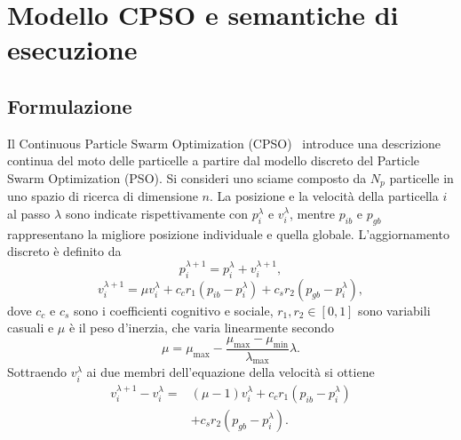 \section{Modello CPSO e semantiche di esecuzione}
\label{sec:model}

\subsection{Formulazione}
\label{subsec:cpso-original-formulation}

Il Continuous Particle Swarm Optimization (CPSO)~\citep{orlando2020analytic} introduce una descrizione continua del moto delle particelle a partire dal modello discreto del Particle Swarm Optimization (PSO). Si consideri uno sciame composto da $N_p$ particelle in uno spazio di ricerca di dimensione $n$. La posizione e la velocit\`a della particella $i$ al passo $\lambda$ sono indicate rispettivamente con $p_i^\lambda$ e $v_i^\lambda$, mentre $p_{ib}$ e $p_{gb}$ rappresentano la migliore posizione individuale e quella globale. L'aggiornamento discreto \`e definito da
\begin{equation}
 p_i^{\lambda+1}=p_i^\lambda+v_i^{\lambda+1},
 \label{eq:or-discrete-position}
\end{equation}
\begin{equation}
 v_i^{\lambda+1}=\mu v_i^\lambda
 +c_c r_1(p_{ib}-p_i^\lambda)
 +c_s r_2(p_{gb}-p_i^\lambda),
 \label{eq:or-discrete-velocity}
\end{equation}
dove $c_c$ e $c_s$ sono i coefficienti cognitivo e sociale, $r_1,r_2\in[0,1]$ sono variabili casuali e $\mu$ \`e il peso d'inerzia, che varia linearmente secondo
\begin{equation}
 \mu=\mu_{\max}-\frac{\mu_{\max}-\mu_{\min}}{\lambda_{\max}}\lambda.
 \label{eq:or-inertia}
\end{equation}
Sottraendo $v_i^\lambda$ ai due membri dell'equazione della velocit\`a si ottiene
\begin{equation}
\begin{aligned}
 v_i^{\lambda+1}-v_i^\lambda
 ={}&(\mu-1)v_i^\lambda+c_c r_1(p_{ib}-p_i^\lambda)\\
 &+c_s r_2(p_{gb}-p_i^\lambda).
\end{aligned}
\label{eq:or-velocity-difference}
\end{equation}

